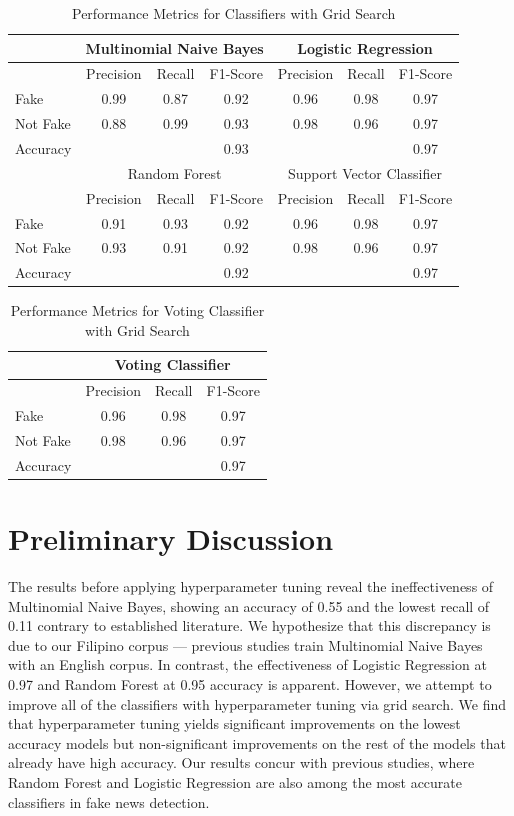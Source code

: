 \begin{table}[ht]
\centering
\begin{tabular}{|l|ccc|ccc|}
\hline
& \multicolumn{3}{c|}{Multinomial Naive Bayes} & \multicolumn{3}{c|}{Logistic Regression} \\
\hline
& Precision & Recall & F1-Score & Precision & Recall & F1-Score \\
\hline
Fake & 0.99 & 0.87 & 0.92 & 0.96 & 0.98 & 0.97 \\
Not Fake & 0.88 & 0.99 & 0.93 & 0.98 & 0.96 & 0.97 \\
Accuracy & & & 0.93 & & & 0.97 \\
\hline
& \multicolumn{3}{c|}{Random Forest} & \multicolumn{3}{c|}{Support Vector Classifier} \\
\hline
& Precision & Recall & F1-Score & Precision & Recall & F1-Score \\
\hline
Fake & 0.91 & 0.93 & 0.92 & 0.96 & 0.98 & 0.97 \\
Not Fake & 0.93 & 0.91 & 0.92 & 0.98 & 0.96 & 0.97 \\
Accuracy & & & 0.92 & & & 0.97 \\
\hline
\end{tabular}
\caption{Performance Metrics for Classifiers with Grid Search}
\label{tab:classifier-metrics-updated}
\end{table}

\begin{table}[ht]
\centering
\begin{tabular}{|l|ccc|}
\hline
& \multicolumn{3}{c|}{Voting Classifier} \\
\hline
& Precision & Recall & F1-Score \\
\hline
Fake & 0.96 & 0.98 & 0.97 \\
Not Fake & 0.98 & 0.96 & 0.97 \\
Accuracy & & & 0.97 \\
\hline
\end{tabular}
\caption{Performance Metrics for Voting Classifier with Grid Search}
\label{tab:voting-classifier-metrics-updated}
\end{table}

\clearpage

\section{Preliminary Discussion}
The results before applying hyperparameter tuning reveal the ineffectiveness of Multinomial Naive Bayes, showing an accuracy of 0.55 and the lowest recall of 0.11 contrary to established literature. We hypothesize that this discrepancy is due to our Filipino corpus — previous studies train Multinomial Naive Bayes with an English corpus. In contrast, the effectiveness of Logistic Regression at 0.97 and Random Forest at 0.95 accuracy is apparent. However, we attempt to improve all of the classifiers with hyperparameter tuning via grid search. We find that hyperparameter tuning yields significant improvements on the lowest accuracy models but non-significant improvements on the rest of the models that already have high accuracy. Our results concur with previous studies, where Random Forest and Logistic Regression are also among the most accurate classifiers in fake news detection.

